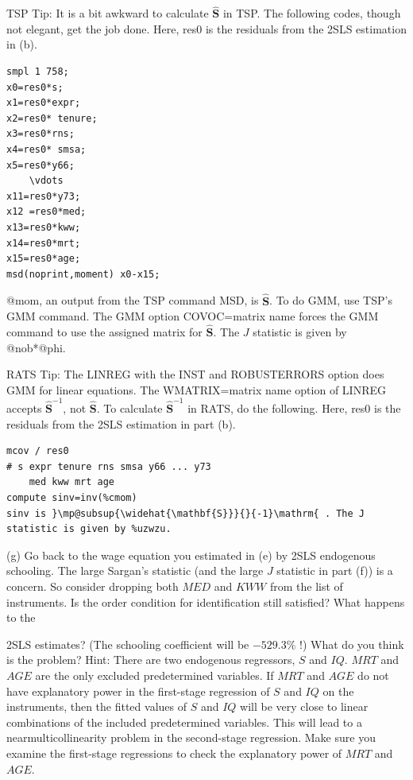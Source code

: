 \documentclass[10pt]{article}
\begin{document}
TSP Tip: It is a bit awkward to calculate $\widehat{\mathbf{S}}$ in TSP. The following codes, though not elegant, get the job done. Here, res0 is the residuals from the 2SLS estimation in (b).

\begin{verbatim}
smpl 1 758;
x0=res0*s;
x1=res0*expr;
x2=res0* tenure;
x3=res0*rns;
x4=res0* smsa;
x5=res0*y66;
    \vdots
x11=res0*y73;
x12 =res0*med;
x13=res0*kww;
x14=res0*mrt;
x15=res0*age;
msd(noprint,moment) x0-x15;
\end{verbatim}

@mom, an output from the TSP command MSD, is $\widehat{\mathbf{S}}$. To do GMM, use TSP's GMM command. The GMM option COVOC=matrix name forces the GMM command to use the assigned matrix for $\widehat{\mathbf{S}}$. The $J$ statistic is given by @nob*@phi.

RATS Tip: The LINREG with the INST and ROBUSTERRORS option does GMM for linear equations. The WMATRIX=matrix name option of LINREG accepts $\widehat{\mathbf{S}}^{-1}$, not $\widehat{\mathbf{S}}$. To calculate $\widehat{\mathbf{S}}^{-1}$ in RATS, do the following. Here, res0 is the residuals from the 2SLS estimation in part (b).

\begin{verbatim}
mcov / res0
# s expr tenure rns smsa y66 ... y73
    med kww mrt age
compute sinv=inv(%cmom)
sinv is }\mp@subsup{\widehat{\mathbf{S}}}{}{-1}\mathrm{ . The J statistic is given by %uzwzu.
\end{verbatim}

(g) Go back to the wage equation you estimated in (e) by 2SLS endogenous schooling. The large Sargan's statistic (and the large $J$ statistic in part (f)) is a concern. So consider dropping both $M E D$ and $K W W$ from the list of instruments. Is the order condition for identification still satisfied? What happens to the

2SLS estimates? (The schooling coefficient will be $-529.3 \%$ !) What do you think is the problem? Hint: There are two endogenous regressors, $S$ and $I Q$. $M R T$ and $A G E$ are the only excluded predetermined variables. If $M R T$ and $A G E$ do not have explanatory power in the first-stage regression of $S$ and $I Q$ on the instruments, then the fitted values of $S$ and $I Q$ will be very close to linear combinations of the included predetermined variables. This will lead to a nearmulticollinearity problem in the second-stage regression. Make sure you examine the first-stage regressions to check the explanatory power of $M R T$ and $A G E$.
\end{document}
